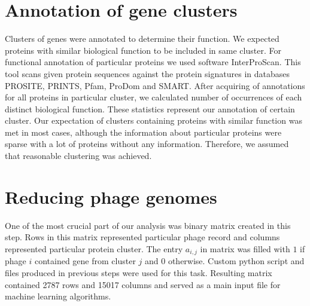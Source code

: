 


\section{Annotation of gene clusters}
Clusters of genes were annotated to determine their function.
We expected proteins with similar biological function to be included in same cluster.
For functional annotation of particular proteins we used software InterProScan\cite{interpro}.
This tool scans given protein sequences against the protein signatures in databases PROSITE\cite{prosite}, PRINTS\cite{prints}, Pfam\cite{pfam}, ProDom\cite{prodom} and SMART\cite{smart}.
After acquiring of annotations for all proteins in particular cluster, we calculated number of occurrences of each distinct biological function.
These statistics represent our annotation of certain cluster.
Our expectation of clusters containing proteins with similar function was met in most cases, although the information about particular proteins were sparse with a lot of proteins without any information.
Therefore, we assumed that reasonable clustering was achieved.

\section{Reducing phage genomes}
One of the most crucial part of our analysis was binary matrix created in this step.
Rows in this matrix represented particular phage record and columns represented particular protein cluster.
The entry $a_{i,j}$ in matrix was filled with $1$ if phage $i$ contained gene from cluster $j$ and $0$ otherwise.
Custom python script and files produced in previous steps were used for this task.
Resulting matrix contained 2787 rows and 15017 columns and served as a main input file for machine learning algorithms.

